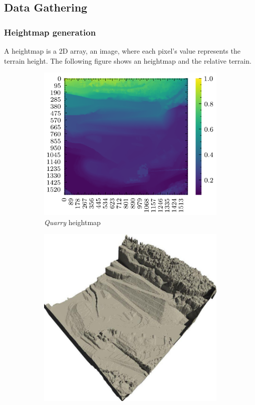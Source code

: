 \documentclass[../document.tex]{subfiles}
\begin{document}
\subsection{Data Gathering}
\subsubsection{Heightmap generation}
A heightmap is a 2D array, an image, where each pixel's value represents the terrain height. The following figure shows an heightmap and the relative terrain.

\begin{figure}[H]
    \centering
        \begin{subfigure}[b]{0.45\textwidth}
            \includegraphics[width=\textwidth]{../img/hm/querry-big-10.png}
            \caption{\emph{Quarry} heightmap}
        \end{subfigure}
        \begin{subfigure}[b]{0.45\linewidth}
            \includegraphics[width=\textwidth]{../img/quarry-rendered.png}

\end{subfigure}
\end{figure}
\end{document}
